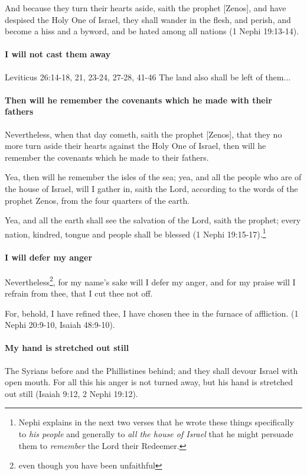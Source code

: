 And because they turn their hearts aside, saith the prophet [Zenos], and have despised the Holy One of Israel, they shall wander in the flesh, and perish, and become a hiss and a byword, and be hated among all nations (1 Nephi 19:13-14).

\paragraph{I will not cast them away}
Leviticus 26:14-18, 21, 23-24, 27-28, 41-46
The land also shall be left of them...

\paragraph{Then will he remember the covenants which he made with their fathers}
Nevertheless, when that day cometh, saith the prophet [Zenos], that they no more turn aside their hearts against the Holy One of Israel, then will he remember the covenants which he made to their fathers.

Yea, then will he remember the isles of the sea; yea, and all the people who are of the house of Israel, will I gather in, saith the Lord, according to the words of the prophet Zenos, from the four quarters of the earth.

Yea, and all the earth shall see the salvation of the Lord, saith the prophet; every nation, kindred, tongue and people shall be blessed (1 Nephi 19:15-17).\footnote{Nephi explains in the next two verses that he wrote these things specifically to \textit{his people} and generally to \textit{all the house of Israel} that he might persuade them to \textit{remember} the Lord their Redeemer.}

\paragraph{I will defer my anger}
Nevertheless\footnote{even though you have been unfaithful}, for my name's sake will I defer my anger, and for my praise will I refrain from thee, that I cut thee not off.

For, behold, I have refined thee, I have chosen thee in the furnace of affliction. (1 Nephi 20:9-10, Isaiah 48:9-10).

\paragraph{My hand is stretched out still}
The Syrians before and the Phillistines behind; and they shall devour Israel with open mouth. For all this his anger is not turned away, but his hand is stretched out still (Isaiah 9:12, 2 Nephi 19:12).


